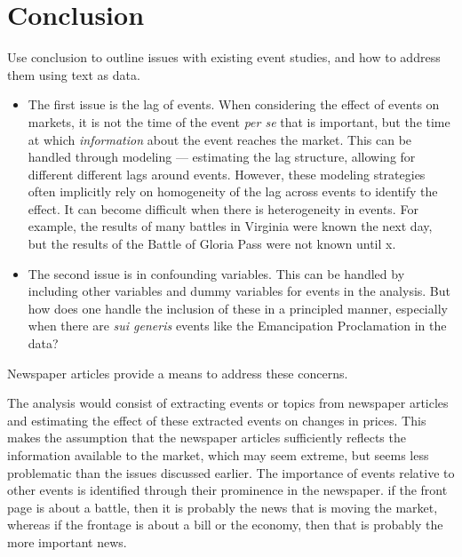 \section{Conclusion}
\label{bonds_battles:sec:conclusion}

Use conclusion to outline issues with existing event studies, and how to address them using text as data.

\begin{itemize}
\item The first issue is the lag of events.
  When considering the effect of events on markets, it is not the time of the event \textit{per se} that is important, but the time at which \textit{information} about the event reaches the market.
  This can be handled through modeling --- \eg{} estimating the lag structure, allowing for different different lags around events.
  However, these modeling strategies often implicitly rely on homogeneity of the lag across events to identify the effect.
  It can become difficult when there is heterogeneity in events. For example, the results of many battles in Virginia were known the next day, but the results of the Battle of Gloria Pass were not known until x.

\item The second issue is in confounding variables.
  This can be handled by including other variables and dummy variables for events in the analysis.
  But how does one handle the inclusion of these in a principled manner, especially when there are \textit{sui generis} events like the Emancipation Proclamation in the data?
\end{itemize}

Newspaper articles provide a means to address these concerns.

The analysis would consist of extracting events or topics from newspaper articles and estimating the effect of these extracted events on changes in prices.
This makes the assumption that the newspaper articles sufficiently reflects the information available to the market, which may seem extreme, but seems less problematic than the issues discussed earlier.
The importance of events relative to other events is identified through their prominence in the newspaper. \eg{} if the front page is about a battle, then it is probably the news that is moving the market, whereas if the frontage is about a bill or the economy, then that is probably the more important news.

